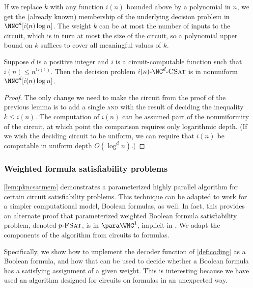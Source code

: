 If we replace $k$ with any function $i(n)$ bounded above by a polynomial in $n$, we get the (already known) membership of the underlying decision problem in $\NNC^d[i(n) \log n]$.
The weight $k$ can be at most the number of inputs to the circuit, which is in turn at most the size of the circuit, so a polynomial upper bound on $k$ suffices to cover all meaningful values of $k$.

\begin{corollary}\label{lem:nncmem}
  Suppose $d$ is a positive integer and $i$ is a circuit-computable function such that $i(n) \leq n^{O(1)}$.
  Then the decision problem $\iNCSAT$ is in nonuniform $\NNC^d[i(n) \log n]$.
\end{corollary}
\begin{proof}
  The only change we need to make the circuit from the proof of the previous lemma is to add a single \textsc{and} with the result of deciding the inequality $k \leq i(n)$.
  The computation of $i(n)$ can be assumed part of the nonuniformity of the circuit, at which point the comparison requires only logarithmic depth.
  (If we wish the deciding circuit to be uniform, we can require that $i(n)$ be computable in uniform depth $O(\log^d n)$.)
\end{proof}

\subsubsection{Weighted formula satisfiability problems}

%
%
%
\autoref{lem:pkncsatmem} demonstrates a parameterized highly parallel algorithm for certain circuit satisfiability problems.
%
%
%
This technique can be adapted to work for a simpler computational model, Boolean formulas, as well.
In fact, this provides an alternate proof that parameterized weighted Boolean formula satisfiability problem, denoted $p \textnormal{-} \textsc{FSat}$, is in $\para \WNC^1$, implicit in \autocite[Theorem~3.6]{est15}.
%
%
%
We adapt the components of the algorithm from circuits to formulas.
%
%
%

%
%
%
%
Specifically, we show how to implement the decoder function of \autoref{def:coding} as a Boolean formula, and how that can be used to decide whether a Boolean formula has a satisfying assignment of a given weight.
%
%
%
This is interesting because we have used an algorithm designed for circuits on formulas in an unexpected way.
%
%

